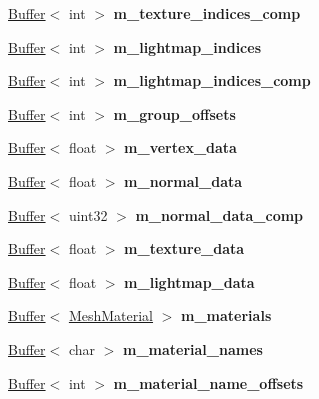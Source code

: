 \begin{DoxyCompactItemize}
\mbox{\label{class_mesh_storage_aa349c97d83413b84c2ea14bf65450143}} 
\hyperlink{class_buffer}{Buffer}$<$ int $>$ {\bfseries m\+\_\+texture\+\_\+indices\+\_\+comp}
\item 
\mbox{\label{class_mesh_storage_a0bae9d6ef97476c97d9934e167c9d99e}} 
\hyperlink{class_buffer}{Buffer}$<$ int $>$ {\bfseries m\+\_\+lightmap\+\_\+indices}
\item 
\mbox{\label{class_mesh_storage_acee04ce1f4504e2b33cbfce6875b3e97}} 
\hyperlink{class_buffer}{Buffer}$<$ int $>$ {\bfseries m\+\_\+lightmap\+\_\+indices\+\_\+comp}
\item 
\mbox{\label{class_mesh_storage_ac41ae9724d14ad0cf35686a723e97a08}} 
\hyperlink{class_buffer}{Buffer}$<$ int $>$ {\bfseries m\+\_\+group\+\_\+offsets}
\item 
\mbox{\label{class_mesh_storage_a5be05e6be65ed1d142ead76255f7272b}} 
\hyperlink{class_buffer}{Buffer}$<$ float $>$ {\bfseries m\+\_\+vertex\+\_\+data}
\item 
\mbox{\label{class_mesh_storage_a04c93c7cde962b82548c8a501fa19c4e}} 
\hyperlink{class_buffer}{Buffer}$<$ float $>$ {\bfseries m\+\_\+normal\+\_\+data}
\item 
\mbox{\label{class_mesh_storage_ae6c8e3f3eb4a696f1bbd20f742a1a94f}} 
\hyperlink{class_buffer}{Buffer}$<$ uint32 $>$ {\bfseries m\+\_\+normal\+\_\+data\+\_\+comp}
\item 
\mbox{\label{class_mesh_storage_a09c2417846df4c2b2a82e5edb5ff1c49}} 
\hyperlink{class_buffer}{Buffer}$<$ float $>$ {\bfseries m\+\_\+texture\+\_\+data}
\item 
\mbox{\label{class_mesh_storage_a329be44680fe676fb4308e6395dca1be}} 
\hyperlink{class_buffer}{Buffer}$<$ float $>$ {\bfseries m\+\_\+lightmap\+\_\+data}
\item 
\mbox{\label{class_mesh_storage_a0c820671c0393cac9641e092d7a0d84d}} 
\hyperlink{class_buffer}{Buffer}$<$ \hyperlink{struct_mesh_material}{Mesh\+Material} $>$ {\bfseries m\+\_\+materials}
\item 
\mbox{\label{class_mesh_storage_a4204905bb48e7083b98d109549271416}} 
\hyperlink{class_buffer}{Buffer}$<$ char $>$ {\bfseries m\+\_\+material\+\_\+names}
\item 
\mbox{\label{class_mesh_storage_a9058557ccd7b26dc4ec07da42041ba5e}} 
\hyperlink{class_buffer}{Buffer}$<$ int $>$ {\bfseries m\+\_\+material\+\_\+name\+\_\+offsets}
\end{DoxyCompactItemize}
